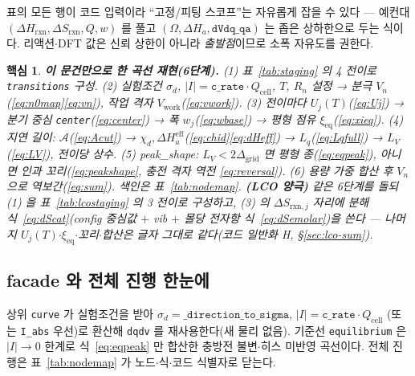 \documentclass[11pt,a4paper]{article}
\newtheorem*{keybox}{핵심}
\newcommand{\eff}{\mathrm{eff}}
\newcommand{\eq}{\mathrm{eq}}
\newcommand{\cell}{\mathrm{cell}}
\newcommand{\rxn}{\mathrm{rxn}}
\newcommand{\work}{\mathrm{work}}
\newcommand{\code}[1]{\texttt{#1}}
\begin{document}
표의 모든 행이 코드 입력이라 ``고정/피팅 스코프''는 자유롭게 잡을 수 있다 — 예컨대 $(\Delta H_\rxn,\Delta S_\rxn,Q,w)$ 를
풀고 $(\Omega,\Delta H_a,\code{dVdq\_qa})$ 는 좁은 상하한으로 두는 식이다. 리액션$\cdot$DFT 값은 신뢰 상한이 아니라
\emph{출발점}이므로 소폭 자유도를 권한다.

\begin{keybox}
\textbf{이 문건만으로 한 곡선 재현(6단계).}
(1) 표~\ref{tab:staging} 의 4 전이로 \code{transitions} 구성.
(2) 실험조건 $\sigma_d$, $|I|=\code{c\_rate}\cdot Q_\cell$, $T$, $R_n$ 설정 → 분극 $V_n$(\eqref{eq:n0map}\eqref{eq:vn}), 작업 격자 $V_\work$(\eqref{eq:vwork}).
(3) 전이마다 $U_j(T)$(\eqref{eq:Uj}) → 분기 중심 \code{center}(\eqref{eq:center}) → 폭 $w_j$(\eqref{eq:wbase}) → 평형 점유 $\xi_\eq$(\eqref{eq:xieq}).
(4) 지연 길이: $\mathcal A$(\eqref{eq:Acut}) → $\chi_d,\Delta H_a^\eff$(\eqref{eq:chid}\eqref{eq:dHeff}) → $L_q$(\eqref{eq:Lqfull}) → $L_V$(\eqref{eq:LV}), 전이당 상수.
(5) peak\_shape: $L_V<2\Delta_\mathrm{grid}$ 면 평형 종(\eqref{eq:eqpeak}), 아니면 인과 꼬리(\eqref{eq:peakshape}, 충전 격자 역전 \eqref{eq:reversal}).
(6) 용량 가중 합산 후 $V_n$ 으로 역보간(\eqref{eq:sum}). 색인은 표~\ref{tab:nodemap}.
\textbf{(LCO 양극)} 같은 6단계를 돌되 (1) 을 표~\ref{tab:lcostaging} 의 3 전이로 구성하고, (3) 의 $\Delta S_{\rxn,j}$
자리에 분해 식~\eqref{eq:dScat}(config 중심값 $+$ vib $+$ 몰당 전자항 식~\eqref{eq:dSemolar})을 쓴다 — 나머지
$U_j(T)$$\cdot$$\xi_\eq$$\cdot$꼬리$\cdot$합산은 글자 그대로 같다(코드 일반화 H, \S\ref{sec:lco-sum}).
\end{keybox}

\subsection{facade 와 전체 진행 한눈에}
상위 \code{curve} 가 실험조건을 받아 $\sigma_d=\code{\_direction\_to\_sigma}$, $|I|=\code{c\_rate}\cdot Q_\cell$
(또는 \code{I\_abs} 우선)로 환산해 \code{dqdv} 를 재사용한다(새 물리 없음). 기준선 \code{equilibrium} 은
$|I|\to0$ 한계로 식~\eqref{eq:eqpeak} 만 합산한 충방전 불변$\cdot$히스 미반영 곡선이다. 전체 진행은 표~\ref{tab:nodemap}
가 노드$\cdot$식$\cdot$코드 식별자로 닫는다.
\end{document}
